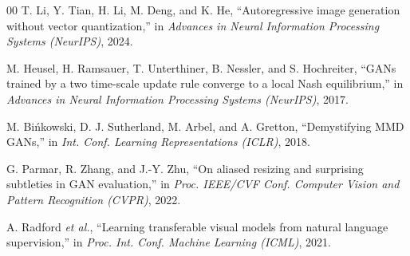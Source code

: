 \documentclass[conference]{IEEEtran}
\begin{document}
\begin{thebibliography}{00}
 T. Li, Y. Tian, H. Li, M. Deng, and K. He,
``Autoregressive image generation without vector quantization,''
in \emph{Advances in Neural Information Processing Systems (NeurIPS)}, 2024.

 M. Heusel, H. Ramsauer, T. Unterthiner, B. Nessler, and S. Hochreiter,
``GANs trained by a two time-scale update rule converge to a local Nash equilibrium,''
in \emph{Advances in Neural Information Processing Systems (NeurIPS)}, 2017.

 M. Bi\'nkowski, D. J. Sutherland, M. Arbel, and A. Gretton,
``Demystifying MMD GANs,''
in \emph{Int. Conf. Learning Representations (ICLR)}, 2018.

 G. Parmar, R. Zhang, and J.-Y. Zhu,
``On aliased resizing and surprising subtleties in GAN evaluation,''
in \emph{Proc. IEEE/CVF Conf. Computer Vision and Pattern Recognition (CVPR)}, 2022.

 A. Radford \emph{et al.},
``Learning transferable visual models from natural language supervision,''
in \emph{Proc. Int. Conf. Machine Learning (ICML)}, 2021.

\end{thebibliography}
\end{document}

